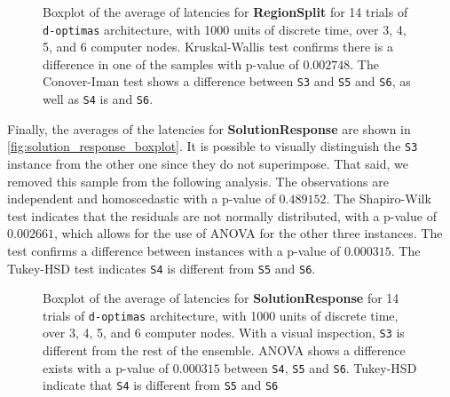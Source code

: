 \documentclass[preprint,12pt]{elsarticle}
\begin{document}
\begin{figure}[ht!]
    \centering
    
    \caption{Boxplot of the average of latencies for \textbf{RegionSplit} for 14 trials of \texttt{d-optimas} architecture, with 1000 units of discrete time, over 3, 4, 5, and 6 computer nodes. Kruskal-Wallis test confirms there is a difference in one of the samples with p-value of $0.002748$. The Conover-Iman test shows a difference between \texttt{S3} and \texttt{S5} and \texttt{S6}, as well as \texttt{S4} is and \texttt{S6}. }
    \label{fig:region_split_boxplot}
\end{figure}

Finally, the averages of the latencies for \textbf{SolutionResponse} are shown in \autoref{fig:solution_response_boxplot}. It is possible to visually distinguish the \texttt{S3} instance from the other one since they do not superimpose. That said, we removed this sample from the following analysis. The observations are independent and homoscedastic with a p-value of $ 0.489152$. The Shapiro-Wilk test indicates that the residuals are not normally distributed, with a p-value of $0.002661$, which allows for the use of ANOVA for the other three instances. The test confirms a difference between instances with a p-value of $0.000315$.
The Tukey-HSD test indicates \texttt{S4} is different from \texttt{S5} and \texttt{S6}. 

\begin{figure}[ht!]
    \centering
    
    \caption{Boxplot of the average of latencies for \textbf{SolutionResponse} for 14 trials of \texttt{d-optimas} architecture, with 1000 units of discrete time, over 3, 4, 5, and 6 computer nodes. With a visual inspection, \texttt{S3} is different from the rest of the ensemble. ANOVA shows a difference exists with a p-value of $0.000315$ between \texttt{S4}, \texttt{S5} and \texttt{S6}. Tukey-HSD indicate that \texttt{S4} is different from \texttt{S5} and \texttt{S6}}
    \label{fig:solution_response_boxplot}
\end{figure}
\end{document}
